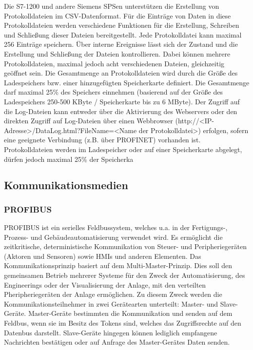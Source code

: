 Die S7-1200 und andere Siemens SPSen unterstützen die Erstellung von Protokolldateien im CSV-Datenformat. Für die Einträge von Daten in diese Protokolldateien werden verschiedene Funktionen für die Erstellung, Schreiben und Schließung dieser Dateien bereitgestellt. Jede Protokolldatei kann maximal 256 Einträge speichern. Über interne Ereignisse lässt sich der Zustand und die Erstellung und Schließung der Dateien kontrollieren. Dabei können mehrere Protokolldateien, maximal jedoch acht verschiedenen Dateien, gleichzeitig geöffnet sein. Die Gesamtmenge an Protokolldateien wird durch die Größe des Ladespeichers bzw. einer hinzugefügten Speicherkarte definiert. Die Gesamtmenge darf maximal 25\% des Speichers einnehmen (basierend auf der Größe des Ladespeichers 250-500 KByte / Speicherkarte bis zu 6 MByte). Der Zugriff auf die Log-Dateien kann entweder über die Aktivierung des Webservers oder den direkten Zugriff auf Log-Dateien über einen Webbrowser (\glqq http://<IP-Adresse>/DataLog.html?FileName=<Name der Protokolldatei>\grqq ) erfolgen, sofern eine geeignete Verbindung (z.B. über PROFINET) vorhanden ist. 
Protokolldateien werden im Ladespeicher oder auf einer Speicherkarte abgelegt, dürfen jedoch maximal 25\% der Speicherka



\subsection{Kommunikationsmedien}
\subsubsection{PROFIBUS}
PROFIBUS ist ein serielles Feldbussystem, welches u.a. in der Fertigungs-, Prozess- und Gebäudeautomatisierung verwendet wird. Es ermöglicht die zeitkritische, deterministische Kommunikation von Steuer- und Peripheriegeräten (Aktoren und Sensoren) sowie HMIs und anderen Elementen. Das Kommunikationsprinzip basiert auf dem Multi-Master-Prinzip. Dies soll den gemeinsamen Betrieb mehrerer Systeme für den Zweck der Automatisierung, des Engineerings oder der Visualisierung der Anlage, mit den verteilten Pheripheriegeräten der Anlage ermöglichen. Zu diesem Zweck werden die Kommunikationsteilnehmer in zwei Gerätearten unterteilt: Master- und Slave-Geräte. Master-Geräte bestimmten die Kommunikation und senden auf dem Feldbus, wenn sie im Besitz des Tokens sind, welches das Zugriffsrechte auf den Datenbus darstellt. Slave-Geräte hingegen können lediglich empfangene Nachrichten bestätigen oder auf Anfrage des Master-Gerätes Daten senden.

